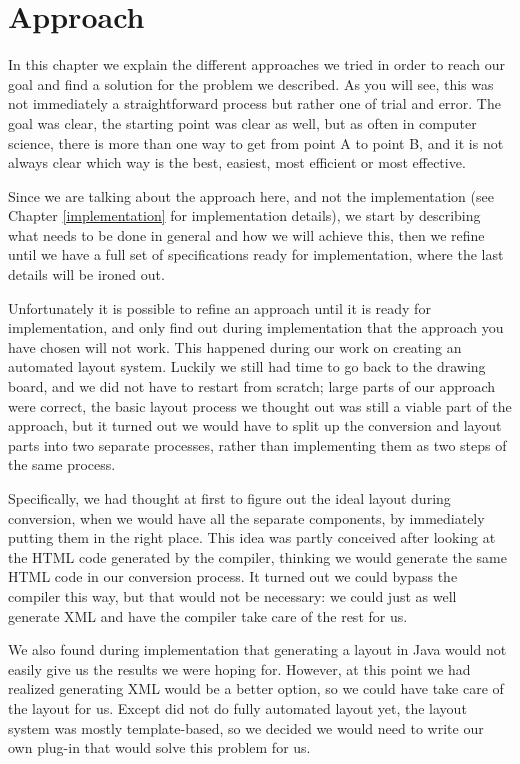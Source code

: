 
 \chapter{Approach}

  In this chapter we explain the different approaches we tried in order to
  reach our goal and find a solution for the problem we described. As you will
  see, this was not immediately a straightforward process but rather one of
  trial and error. The goal was clear, the starting point was clear as well,
  but as often in computer science, there is more than one way to get from
  point A to point B, and it is not always clear which way is the best,
  easiest, most efficient or most effective.
 
  Since we are talking about the approach here, and not the implementation (see
  Chapter \ref{implementation} for implementation details), we start by describing
  what needs to be done in general and how we will achieve this, then we refine until
  we have a full set of specifications ready for implementation, where the last
  details will be ironed out.

  Unfortunately it is possible to refine an approach until it is ready for
  implementation, and only find out during implementation that the approach
  you have chosen will not work. This happened during our work on creating an
  automated layout system. Luckily we still had time to go back to the drawing
  board, and we did not have to restart from scratch; large parts of our
  approach were correct, the basic layout process we thought out was still a
  viable part of the approach, but it turned out we would have to split up the
  conversion and layout parts into two separate processes, rather than
  implementing them as two steps of the same process.
  
  Specifically, we had thought at first to figure out the ideal layout during
  conversion, when we would have all the separate components, by immediately
  putting them in the right place. This idea was partly conceived after looking
  at the HTML code generated by the \mxp compiler, thinking we would generate
  the same HTML code in our conversion process. It turned out we could bypass
  the \mxp compiler this way, but that would not be necessary: we could just as
  well generate \mxp XML and have the compiler take care of the rest for us.
 
  We also found during implementation that generating a layout in Java would
  not easily give us the results we were hoping for. However, at this point we
  had realized generating \mxp XML would be a better option, so we could have
  \mxp take care of the layout for us. Except \mxp did not do fully automated
  layout yet, the layout system was mostly template-based, so we decided we
  would need to write our own \mxp plug-in that would solve this problem for
  us.

